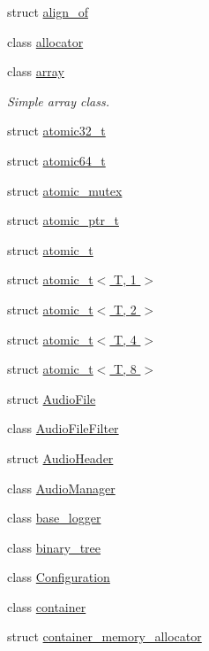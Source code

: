 \begin{DoxyCompactItemize}
\item 
struct \hyperlink{structcrap_1_1align__of}{align\+\_\+of}
\item 
class \hyperlink{classcrap_1_1allocator}{allocator}
\item 
class \hyperlink{classcrap_1_1array}{array}
\begin{DoxyCompactList}\small\item\em Simple array class. \end{DoxyCompactList}\item 
struct \hyperlink{structcrap_1_1atomic32__t}{atomic32\+\_\+t}
\item 
struct \hyperlink{structcrap_1_1atomic64__t}{atomic64\+\_\+t}
\item 
struct \hyperlink{structcrap_1_1atomic__mutex}{atomic\+\_\+mutex}
\item 
struct \hyperlink{structcrap_1_1atomic__ptr__t}{atomic\+\_\+ptr\+\_\+t}
\item 
struct \hyperlink{structcrap_1_1atomic__t}{atomic\+\_\+t}
\item 
struct \hyperlink{structcrap_1_1atomic__t_3_01_t_00_011_01_4}{atomic\+\_\+t$<$ T, 1 $>$}
\item 
struct \hyperlink{structcrap_1_1atomic__t_3_01_t_00_012_01_4}{atomic\+\_\+t$<$ T, 2 $>$}
\item 
struct \hyperlink{structcrap_1_1atomic__t_3_01_t_00_014_01_4}{atomic\+\_\+t$<$ T, 4 $>$}
\item 
struct \hyperlink{structcrap_1_1atomic__t_3_01_t_00_018_01_4}{atomic\+\_\+t$<$ T, 8 $>$}
\item 
struct \hyperlink{structcrap_1_1_audio_file}{Audio\+File}
\item 
class \hyperlink{classcrap_1_1_audio_file_filter}{Audio\+File\+Filter}
\item 
struct \hyperlink{structcrap_1_1_audio_header}{Audio\+Header}
\item 
class \hyperlink{classcrap_1_1_audio_manager}{Audio\+Manager}
\item 
class \hyperlink{classcrap_1_1base__logger}{base\+\_\+logger}
\item 
class \hyperlink{classcrap_1_1binary__tree}{binary\+\_\+tree}
\item 
class \hyperlink{classcrap_1_1_configuration}{Configuration}
\item 
class \hyperlink{classcrap_1_1container}{container}
\item 
struct \hyperlink{structcrap_1_1container__memory__allocator}{container\+\_\+memory\+\_\+allocator}

\end{DoxyCompactItemize}
